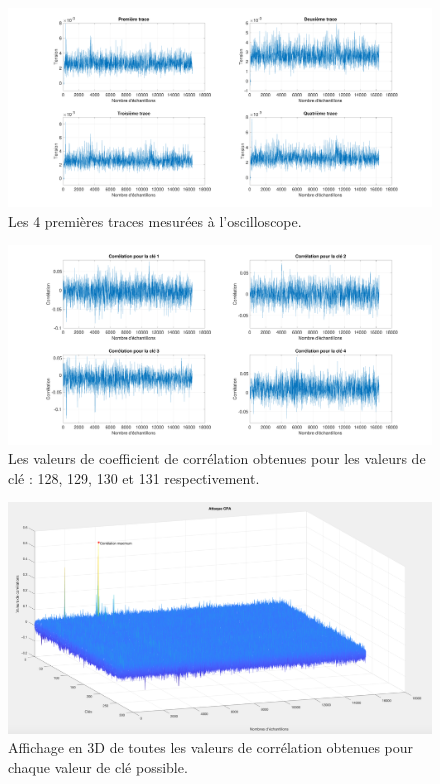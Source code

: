 \documentclass[10pt, oneside, a4paper]{article}
\begin{document}
\begin{figure}[htbp]
    \centering
    \includegraphics[scale=0.45, angle=90]{image/traces}
    \caption{Les 4 premières traces mesurées à l'oscilloscope.}
    \label{fig:traces} 
\end{figure}

\begin{figure}[htbp]
    \centering
    \includegraphics[scale=0.56, angle=90]{image/cle}
    \caption{Les valeurs de coefficient de corrélation obtenues pour les valeurs de clé : 128, 129, 130 et 131 respectivement.}
    \label{fig:cle} 
\end{figure}

\begin{figure}[htbp]
    \centering
    \includegraphics[scale=0.54, angle=90]{image/3D2}
    \caption{Affichage en 3D de toutes les valeurs de corrélation obtenues pour chaque valeur de clé possible.}
    \label{fig:3D} 
\end{figure}
\end{document}
